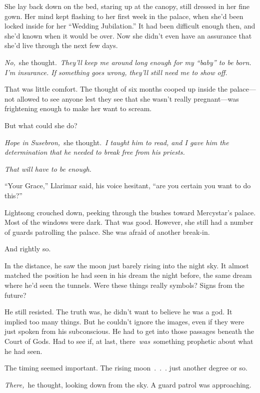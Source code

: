She lay back down on the bed, staring up at the canopy, still dressed in her fine gown. Her mind kept flashing to her first week in the palace, when she’d been locked inside for her “Wedding Jubilation.” It had been difficult enough then, and she’d known when it would be over. Now she didn’t even have an assurance that she’d live through the next few days.

\textit{No,}~she thought.~\textit{They’ll keep me around long enough for my “baby” to be born. I’m insurance. If something goes wrong, they’ll still need me to show off.}

That was little comfort. The thought of six months cooped up inside the palace—not allowed to see anyone lest they see that she wasn’t really pregnant—was frightening enough to make her want to scream.

But what could she do?

\textit{Hope in Susebron,}~she thought.~\textit{I taught him to read, and I gave him the determination that he needed to break free from his priests.}

\textit{That will have to be enough.}

\orn

“Your Grace,” Llarimar said, his voice hesitant, “are you certain you want to do this?”

Lightsong crouched down, peeking through the bushes toward Mercystar’s palace. Most of the windows were dark. That was good. However, she still had a number of guards patrolling the palace. She was afraid of another break-in.

And rightly so.

In the distance, he saw the moon just barely rising into the night sky. It almost matched the position he had seen in his dream the night before, the same dream where he’d seen the tunnels. Were these things really symbols? Signs from the future?

He still resisted. The truth was, he didn’t want to believe he was a god. It implied too many things. But he couldn’t ignore the images, even if they were just spoken from his subconscious. He had to get into those passages beneath the Court of Gods. Had to see if, at last, there~\textit{was}~something prophetic about what he had seen.

The timing seemed important. The rising moon~.~.~. just another degree or so.

\textit{There,}~he thought, looking down from the sky. A guard patrol was approaching.

